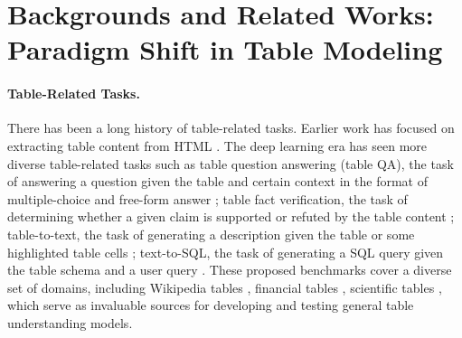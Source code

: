 \documentclass[11pt]{article}
\begin{document}
\section{Backgrounds and Related Works: Paradigm Shift in Table Modeling}


\paragraph{Table-Related Tasks.}
There has been a long history of table-related tasks.
Earlier work has focused on extracting table content from HTML \citep{chen-etal-2000-mining, tengli-etal-2004-learning}.
The deep learning era has seen more diverse table-related tasks such as table question answering (table QA), the task of answering a question given the table and certain context in the format of multiple-choice \citep{jauhar2016tabmcq} and free-form answer \citep{nan-etal-2022-fetaqa}; 
table fact verification, the task of determining whether a given claim is supported or refuted by the table content \citep{Chen2020TabFact, gupta-etal-2020-infotabs}; 
table-to-text, the task of generating a description given the table or some highlighted table cells \citep{parikh-etal-2020-totto};
text-to-SQL, the task of generating a SQL query given the table schema and a user query \citep{zhong2018seqsql, yu-etal-2018-spider}.
These proposed benchmarks cover a diverse set of domains, including Wikipedia tables \citep{parikh-etal-2020-totto}, financial tables \citep{chen-etal-2021-finqa}, scientific tables \citep{moosavi2021scigen}, which serve as invaluable sources for developing and testing general table understanding models.

\end{document}

